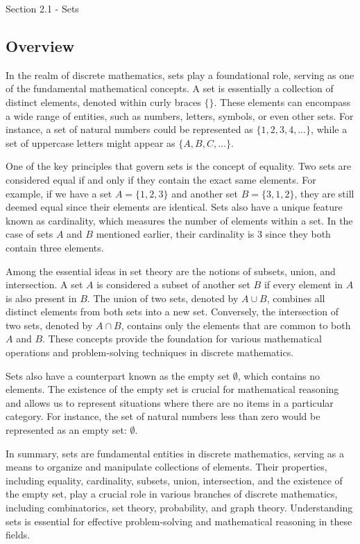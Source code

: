 \begin{notes}{Section 2.1 - Sets}
    \subsection*{Overview}

    In the realm of discrete mathematics, sets play a foundational role, serving as one of the fundamental mathematical concepts. A set is essentially a collection of distinct elements, denoted within 
    curly braces $\{\}$. These elements can encompass a wide range of entities, such as numbers, letters, symbols, or even other sets. For instance, a set of natural numbers could be represented as 
    $\{1, 2, 3, 4, \ldots\}$, while a set of uppercase letters might appear as $\{A, B, C, \ldots\}$.

    One of the key principles that govern sets is the concept of equality. Two sets are considered equal if and only if they contain the exact same elements. For example, if we have a set $A = \{1, 2, 3\}$ 
    and another set $B = \{3, 1, 2\}$, they are still deemed equal since their elements are identical. Sets also have a unique feature known as cardinality, which measures the number of elements 
    within a set. In the case of sets $A$ and $B$ mentioned earlier, their cardinality is 3 since they both contain three elements.

    Among the essential ideas in set theory are the notions of subsets, union, and intersection. A set $A$ is considered a subset of another set $B$ if every element in $A$ is also present in $B$. 
    The union of two sets, denoted by $A \cup B$, combines all distinct elements from both sets into a new set. Conversely, the intersection of two sets, denoted by $A \cap B$, contains only the 
    elements that are common to both $A$ and $B$. These concepts provide the foundation for various mathematical operations and problem-solving techniques in discrete mathematics.

    Sets also have a counterpart known as the empty set $\emptyset$, which contains no elements. The existence of the empty set is crucial for mathematical reasoning and allows us to represent 
    situations where there are no items in a particular category. For instance, the set of natural numbers less than zero would be represented as an empty set: $\emptyset$.

    In summary, sets are fundamental entities in discrete mathematics, serving as a means to organize and manipulate collections of elements. Their properties, including equality, cardinality, 
    subsets, union, intersection, and the existence of the empty set, play a crucial role in various branches of discrete mathematics, including combinatorics, set theory, probability, and graph 
    theory. Understanding sets is essential for effective problem-solving and mathematical reasoning in these fields.


\end{notes}
